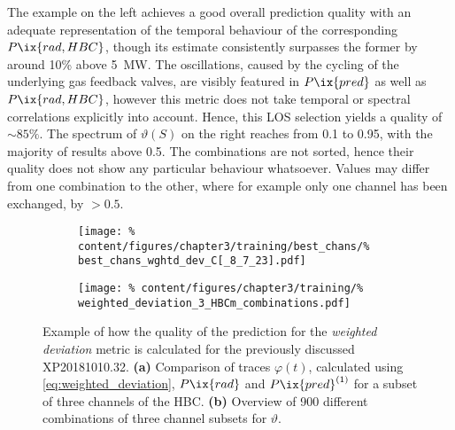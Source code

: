                 The example on the left achieves a good overall prediction quality with an adequate representation of the temporal behaviour of the corresponding $P\ix{rad,HBC}$, though its estimate consistently surpasses the former by around 10\% above \SI{5}{\mega\watt}. The oscillations, caused by the cycling of the underlying gas feedback valves, are visibly featured in $P\ix{pred}$ as well as $P\ix{rad,HBC}$, however this metric does not take temporal or spectral correlations explicitly into account. Hence, this LOS selection yields a quality of $\sim85\%$. The spectrum of $\vartheta\left(S\right)$ on the right reaches from 0.1 to 0.95, with the majority of results above 0.5. The combinations are not sorted, hence their quality does not show any particular behaviour whatsoever. Values may differ from one combination to the other, where for example only one channel has been exchanged, by $>0.5$.\\%
%
                \begin{figure}[t]%
                    \centering%
                    \begin{subfigure}{0.47\textwidth}%
                        \texttt{[image: \%
                            content/figures/chapter3/training/best\_chans/\%
                            best\_chans\_wghtd\_dev\_C[\_8\_7\_23].pdf]}%
                        \caption{}%
                    \end{subfigure}%
                    \hfill%
                    \begin{subfigure}{0.47\textwidth}%
                        \texttt{[image: \%
                            content/figures/chapter3/training/\%
                            weighted\_deviation\_3\_HBCm\_combinations.pdf]}%
                        \caption{}%
                    \end{subfigure}%
                    \caption{Example of how the quality of the prediction for the \textit{weighted deviation} metric is calculated for the previously discussed XP20181010.32. \textbf{(a)} Comparison of traces $\varphi\left(t\right)$, calculated using \cref{eq:weighted_deviation}, $P\ix{rad}$ and $P\ix{pred}^{\left(1\right)}$ for a subset of three channels of the HBC. \textbf{(b)} Overview of 900 different combinations of three channel subsets for $\vartheta$.}\label{fig:weighted_deviation}%
                \end{figure}%
%
